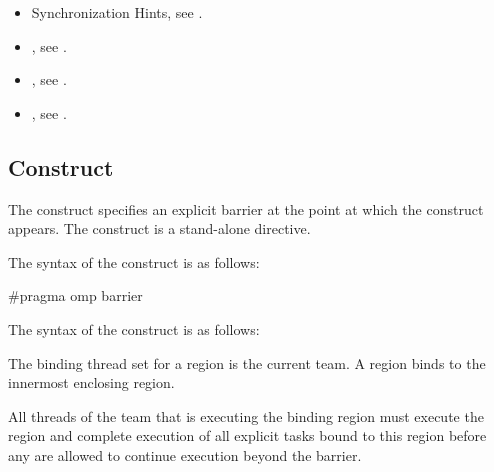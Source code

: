 \crossreferences
\begin{itemize}
\item Synchronization Hints, see
.

\item {}, see
.

\item {}, see
.

\item {}, see
.
\end{itemize}



\subsection{ Construct}
\label{subsec:barrier Construct}
\summary
The  construct specifies an explicit barrier at the point at which 
the construct appears. The  construct is a stand-alone directive.

\syntax
\begin{ccppspecific}
The syntax of the  construct is as follows:

\begin{ompcPragma}
#pragma omp barrier 
\end{ompcPragma}
\end{ccppspecific}

\begin{fortranspecific}
The syntax of the  construct is as follows:

\end{fortranspecific}

\binding
The binding thread set for a  region is the current team. A 
 region binds to the innermost enclosing  region.

\descr
All threads of the team that is executing the binding  region must 
execute the  region and complete execution of all explicit tasks 
bound to this  region before any are allowed to continue execution 
beyond the barrier.

